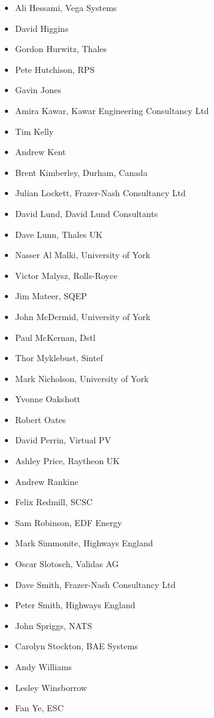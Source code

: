 \begin{itemize}
  \item Ali Hessami, Vega Systems
  \item David Higgins
  \item Gordon Hurwitz, Thales
  \item Pete Hutchison, RPS
  \item Gavin Jones
  \item Amira Kawar, Kawar Engineering Consultancy Ltd
  \item Tim Kelly
  \item Andrew Kent
  \item Brent Kimberley, Durham, Canada
  \item Julian Lockett, Frazer-Nash Consultancy Ltd
  \item David Lund, David Lund Consultants
  \item Dave Lunn, Thales UK
  \item Nasser Al Malki, University of York
  \item Victor Malysz, Rolls-Royce
  \item Jim Mateer, SQEP
  \item John McDermid, University of York
  \item Paul McKernan, Dstl
  \item Thor Myklebust, Sintef
  \item Mark Nicholson, University of York
  \item Yvonne Oakshott
  \item Robert Oates
  \item David Perrin, Virtual PV
  \item Ashley Price, Raytheon UK
  \item Andrew Rankine
  \item Felix Redmill, SCSC
  \item Sam Robinson, EDF Energy
  \item Mark Simmonite, Highways England
  \item \cbstart Oscar Slotosch, Validas AG\cbend
  \item Dave Smith, Frazer-Nash Consultancy Ltd
  \item Peter Smith, Highways England
  \item John Spriggs, NATS
  \item Carolyn Stockton, BAE Systems
  \item \cbstart Andy Williams\cbend
  \item Lesley Winsborrow
  \item Fan Ye, ESC
\end{itemize}
